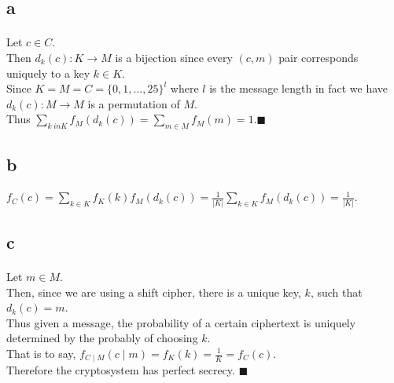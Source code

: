\documentclass[letterpaper,12pt,oneside,onecolumn]{report}
\begin{document}
\subsection*{a}
\paragraph{}
Let $c \in C$.\\
Then $d_k(c) : K \rightarrow M$ is a bijection since every $(c,m)$ pair corresponds uniquely to a key $k \in K$.\\
Since $K = M = C = \{0,1,\dots,25\}^l$ where $l$ is the message length in fact we have $d_k(c) : M \rightarrow M$ is a permutation of $M$.\\
Thus $\sum_{k \ in K}f_M(d_k(c)) = \sum_{m \in M} f_M(m) = 1$.$\blacksquare$
\subsection*{b}
$f_C(c) = \sum_{k \in K} f_K(k)f_M(d_k(c)) = \frac{1}{|K|} \sum_{k \in K}f_M(d_k(c)) = \frac{1}{|K|}$.
\subsection*{c}
\paragraph{}
Let $m \in M$.\\
Then, since we are using a shift cipher, there is a unique key, $k$, such that $d_k(c) = m$.\\
Thus given a message, the probability of a certain ciphertext is uniquely determined by the probably of choosing $k$.\\
That is to say, $f_{C \mid M}(c \mid m) = f_K(k) = \frac{1}{K} = f_C(c)$.\\
Therefore the cryptosystem has perfect secrecy. $\blacksquare$
\end{document}
